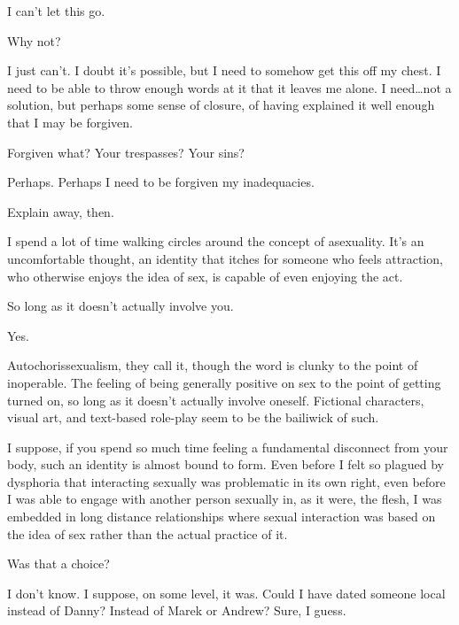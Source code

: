\begin{paracol}{2}
\begin{rightcolumn*}

\end{rightcolumn*}
\begin{leftcolumn}
\noindent I can't let this go.

\begin{ally}
Why not?
\end{ally}
I just can't. I doubt it's possible, but I need to somehow get this off my chest. I need to be able to throw enough words at it that it leaves me alone. I need\ldots{}not a solution, but perhaps some sense of closure, of having explained it well enough that I may be forgiven.

\begin{ally}
Forgiven what? Your trespasses? Your sins?
\end{ally}
Perhaps. Perhaps I need to be forgiven my inadequacies.

\begin{ally}
Explain away, then.
\end{ally}
I spend a lot of time walking circles around the concept of asexuality. It's an uncomfortable thought, an identity that itches for someone who feels attraction, who otherwise enjoys the idea of sex, is capable of even enjoying the act.

\begin{ally}
So long as it doesn't actually involve you.
\end{ally}
Yes.

Autochorissexualism, they call it, though the word is clunky to the point of inoperable. The feeling of being generally positive on sex to the point of getting turned on, so long as it doesn't actually involve oneself. Fictional characters, visual art, and text-based role-play seem to be the bailiwick of such.

I suppose, if you spend so much time feeling a fundamental disconnect from your body, such an identity is almost bound to form. Even before I felt so plagued by dysphoria that interacting sexually was problematic in its own right, even before I was able to engage with another person sexually in, as it were, the flesh, I was embedded in long distance relationships where sexual interaction was based on the idea of sex rather than the actual practice of it.

\begin{ally}
Was that a choice?
\end{ally}
I don't know. I suppose, on some level, it was. Could I have dated someone local instead of Danny? Instead of Marek or Andrew? Sure, I guess.


\end{leftcolumn}
\end{paracol}
